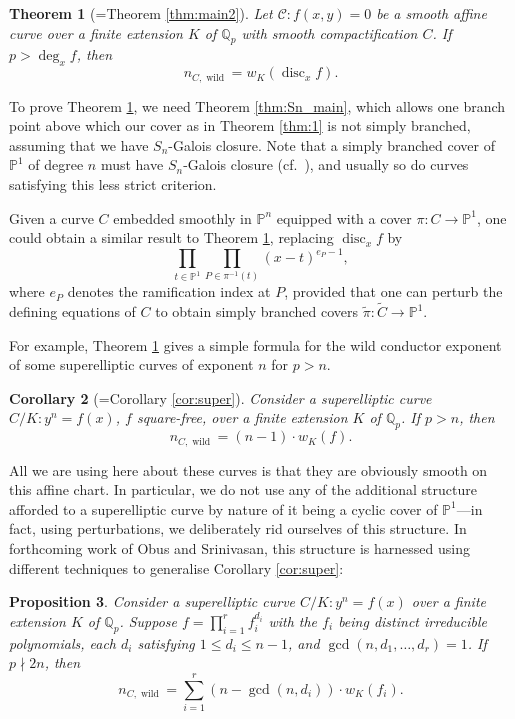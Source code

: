 \documentclass[12pt]{amsart}
\newtheorem{theorem}{Theorem}[section]
\newtheorem{corollary}[theorem]{Corollary}
\newtheorem{proposition}[theorem]{Proposition}
\theoremstyle{definition}
\newenvironment{remark}
  {\pushQED{\qed}\renewcommand{\qedsymbol}{$\diamondsuit$}\remarkx}
  {\popQED\endremarkx}
\theoremstyle{remark}
\newcommand{\QQ}{\mathbb{Q}}
\newcommand{\Proj}{\mathbb{P}}
\DeclareMathOperator{\disc}{disc}
\DeclareMathOperator{\wild}{wild}
\renewcommand{\tilde}{\widetilde}
\begin{document}
\begin{theorem}[{=Theorem \ref{thm:main2}}]\label{thm:main}
    Let $\mathcal{C}:f(x,y)=0$ be a smooth affine curve over a finite extension $K$ of $\QQ_p$ with smooth compactification $C$. If $p>\deg_x f$, then
    \[n_{{C},\wild}=w_K(\disc_x f).\]
\end{theorem}

\begin{remark}
    To prove Theorem \ref{thm:main}, we need Theorem \ref{thm:Sn_main}, which allows one branch point above which our cover as in Theorem \ref{thm:1} is not simply branched, assuming that we have $S_n$-Galois closure. Note that a simply branched cover of $\Proj^1$ of degree $n$ must have $S_n$-Galois closure (cf.\ \cite[Corollary 3.2]{BKP2024}), and usually so do curves satisfying this less strict criterion.
\end{remark}

\begin{remark}
    Given a curve $C$ embedded smoothly in $\Proj^n$ equipped with a cover $\pi:C\to \Proj^1$, one could obtain a similar result to Theorem \ref{thm:main}, replacing $\disc_x f$ by
    \[\prod_{t\in\Proj^1}\prod_{P\in\pi^{-1}(t)} (x-t)^{e_P-1},\]
    where $e_P$ denotes the ramification index at $P$, provided that one can perturb the defining equations of $C$ to obtain simply branched covers $\tilde{\pi} : \tilde{C} \to \Proj^1$.
\end{remark}

For example, Theorem \ref{thm:main} gives a simple formula for the wild conductor exponent of some superelliptic curves of exponent $n$ for $p>n$.

\begin{corollary}[{=Corollary \ref{cor:super}}]\label{cor:intro}
    Consider a superelliptic curve ${C}/K: y^n = f(x)$, $f$ square-free, over a finite extension $K$ of $\QQ_p$. If $p>n$, then
    \[n_{{C},\wild}=(n-1)\cdot w_K(f).\]
\end{corollary}

All we are using here about these curves is that they are obviously smooth on this affine chart. In particular, we do not use any of the additional structure afforded to a superelliptic curve by nature of it being a cyclic cover of $\Proj^1$---in fact, using perturbations, we deliberately rid ourselves of this structure. In forthcoming work of Obus and Srinivasan, this structure is harnessed using different techniques to generalise Corollary \ref{cor:super}:

\begin{proposition}\label{prop:super}
    Consider a superelliptic curve ${C}/K: y^n = f(x)$ over a finite extension $K$ of $\QQ_p$. Suppose $f=\prod_{i=1}^rf_i^{d_i}$ with the $f_i$ being distinct irreducible polynomials, each $d_i$ satisfying $1\le d_i\le n-1$, and $\gcd(n,d_1,\hdots,d_r)=1$. If $p\nmid 2n$, then
    \[n_{{C},\wild}=\sum_{i=1}^r(n-\gcd(n,d_i))\cdot w_K(f_i).\]
\end{proposition}
\end{document}

